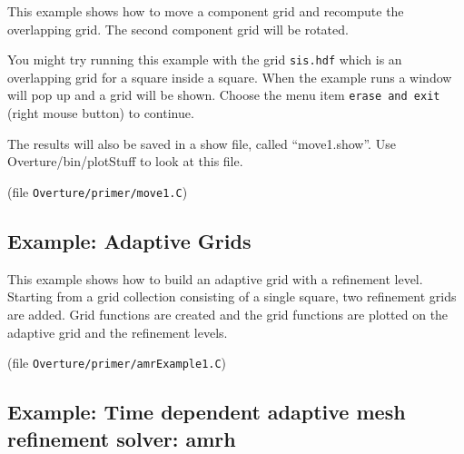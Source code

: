 \documentclass{article}
\begin{document}
This example shows how to move a component grid and recompute the
overlapping grid. The second component grid will be rotated.

You might try running this example with the grid {\tt sis.hdf} which
is an overlapping grid for a square inside a square. When the 
example runs a window will pop up and a grid will be shown. Choose
the menu item {\tt erase and exit} (right mouse button) to continue.

The results will also be saved in a show file, called ``move1.show''.
Use Overture/bin/plotStuff to look at this file.

(file {\tt Overture/primer/move1.C})
{\footnotesize
{}
}

\vfill\eject
\subsection{Example: Adaptive Grids}

This example shows how to build an adaptive grid with a refinement level.
Starting from a grid collection consisting of a single square, two refinement
grids are added. Grid functions are created and the grid functions are plotted
on the adaptive grid and the refinement levels.

(file {\tt Overture/primer/amrExample1.C})
{\footnotesize
{}
}

\vfill\eject
\subsection{Example: Time dependent adaptive mesh refinement solver: amrh}
\end{document}
